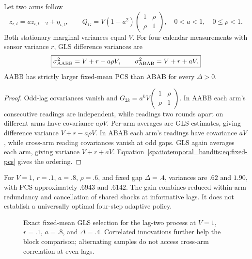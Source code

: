 \begin{proposition}
Let two arms follow
\begin{equation}
z_{i,t}=a z_{i,t-2}+\eta_{i,t},\qquad
Q_G=V(1-a^2)\begin{pmatrix}1&\rho\\\rho&1\end{pmatrix},
\quad0<a<1,\quad0\le\rho<1.
\label{spatiotemporal_bandits:eq:lag-two}
\end{equation}
Both stationary marginal variances equal $V$. For four calendar measurements with sensor variance $r$, GLS difference variances are
\begin{equation}
\boxed{\sigma^2_{\rm AABB}=V+r-a\rho V,\qquad
\sigma^2_{\rm ABAB}=V+r+aV.}
\label{spatiotemporal_bandits:eq:design-variance}
\end{equation}
AABB has strictly larger fixed-mean PCS than ABAB for every $\Delta>0$.
\end{proposition}
\begin{proof}
Odd-lag covariances vanish and $G_{2k}=a^kV\begin{pmatrix}1&\rho\\\rho&1\end{pmatrix}$. In AABB each arm's consecutive readings are independent, while readings two rounds apart on different arms have covariance $a\rho V$. Per-arm averages are GLS estimates, giving difference variance $V+r-a\rho V$. In ABAB each arm's readings have covariance $aV$, while cross-arm reading covariances vanish at odd gaps. GLS again averages each arm, giving variance $V+r+aV$. Equation~\eqref{spatiotemporal_bandits:eq:fixed-pcs} gives the ordering.
\end{proof}

For $V=1$, $r=.1$, $a=.8$, $\rho=.6$, and fixed gap $\Delta=.4$, variances are $.62$ and $1.90$, with PCS approximately $.6943$ and $.6142$. The gain combines reduced within-arm redundancy and cancellation of shared shocks at informative lags. It does not establish a universally optimal four-step adaptive policy.

\begin{figure}[t]
\centering
{}
\caption{Exact fixed-mean GLS selection for the lag-two process at $V=1$, $r=.1$, $a=.8$, and $\Delta=.4$. Correlated innovations further help the block comparison; alternating samples do not access cross-arm correlation at even lags.}
\label{spatiotemporal_bandits:fig:pcs}
\end{figure}

